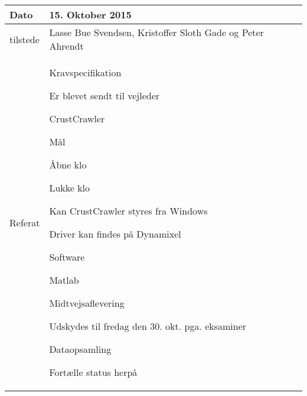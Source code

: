 \begin{center}
	\begin{tabular}{| l | p{10cm} |}
		\hline
		Dato		& 15. Oktober 2015\\ \hline
		tilstede 	& Lasse Bue Svendsen, Kristoffer Sloth Gade og Peter Ahrendt\\ \hline
		Referat		& \vspace{-5mm}\begin{myEnumerate}
			\item Kravspecifikation
			\begin{myItemize}				
				\item Er blevet sendt til vejleder
			\end{myItemize}
			\item CrustCrawler
			\begin{myItemize}
				\item Mål
				\begin{myItemize}
					\item Åbne klo
					\item Lukke klo
				\end{myItemize}
				\item Kan CrustCrawler styres fra Windows
				\begin{myItemize}
					\item Driver kan findes på Dynamixel
					\begin{myItemize}
						\item Software
						\item Matlab
					\end{myItemize}
				\end{myItemize}
			\end{myItemize}
			\item Midtvejsaflevering
			\begin{myItemize}
				\item Udskydes til fredag den 30. okt. pga. eksaminer
			\end{myItemize}
			\item Dataopsamling
			\begin{myItemize}
				\item Fortælle status herpå
			\end{myItemize}
		\end{myEnumerate}\\ 	
		\hline
	\end{tabular}
\end{center}

